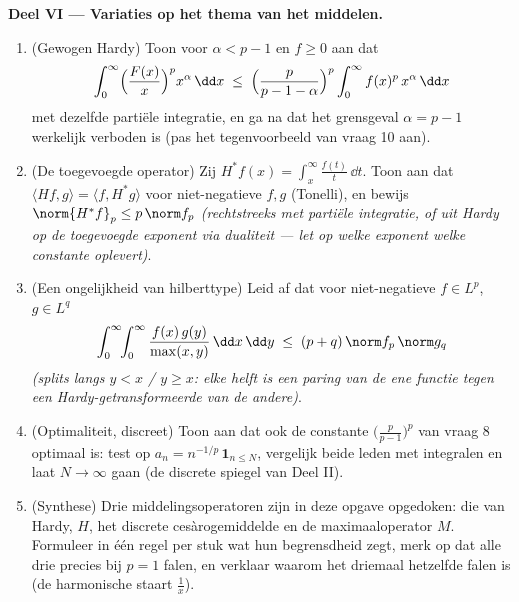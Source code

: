 \begin{problem}
\medskip
\noindent\textbf{Deel VI --- Variaties op het thema van het
middelen.}
\begin{enumerate}[resume]
  \item (Gewogen Hardy) Toon voor $\alpha < p - 1$ en $f \geq 0$
        aan dat
        \[
        \int_0^\infty\Bigl(\frac{F(x)}x\Bigr)^{p}
        x^{\alpha}\,\dd x \;\leq\;
        \Bigl(\frac{p}{p - 1 - \alpha}\Bigr)^{p}
        \int_0^\infty f(x)^p\,x^{\alpha}\,\dd x
        \]
        met dezelfde partiële integratie, en ga na dat het
        grensgeval $\alpha = p - 1$ werkelijk verboden is (pas
        het tegenvoorbeeld van vraag 10 aan).
  \item (De toegevoegde operator) Zij $H^*f(x) =
        \int_x^{\infty}\frac{f(t)}t\,\dd t$. Toon aan dat
        $\langle Hf, g\rangle = \langle f, H^*g\rangle$ voor
        niet-negatieve $f, g$ (Tonelli), en bewijs
        $\norm{H^*f}_p \leq p\,\norm f_p$ \emph{(rechtstreeks
        met partiële integratie, of uit Hardy op de toegevoegde
        exponent via dualiteit --- let op welke exponent welke
        constante oplevert)}.
  \item (Een ongelijkheid van hilberttype) Leid af dat voor
        niet-negatieve $f \in L^p$, $g \in L^q$
        \[
        \int_0^\infty\!\!\int_0^\infty
        \frac{f(x)\,g(y)}{\max(x,y)}\,\dd x\,\dd y
        \;\leq\; (p + q)\,\norm f_p\,\norm g_q
        \]
        \emph{(splits langs $y < x$ / $y \geq x$: elke helft is
        een paring van de ene functie tegen een
        Hardy-getransformeerde van de andere)}.
  \item (Optimaliteit, discreet) Toon aan dat ook de constante
        $\bigl(\frac p{p-1}\bigr)^p$ van vraag 8 optimaal is:
        test op $a_n = n^{-1/p}\,\mathbf 1_{n \leq N}$,
        vergelijk beide leden met integralen en laat $N \to
        \infty$ gaan (de discrete spiegel van Deel II).
  \item (Synthese) Drie middelingsoperatoren zijn in deze opgave
        opgedoken: die van Hardy, $H$, het discrete
        cesàrogemiddelde en de maximaaloperator $M$. Formuleer
        in één regel per stuk wat hun begrensdheid zegt, merk op
        dat alle drie precies bij $p = 1$ falen, en verklaar
        waarom het driemaal hetzelfde falen is (de harmonische
        staart $\frac1x$).
\end{enumerate}


\end{problem}
